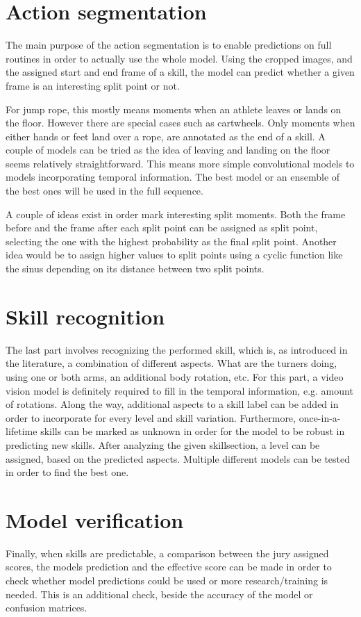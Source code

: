 \section{Action segmentation}

The main purpose of the action segmentation is to enable predictions on full routines in order to actually use the whole model. Using the cropped images, and the assigned start and end frame of a skill, the model can predict whether a given frame is an interesting split point or not.

For jump rope, this mostly means moments when an athlete leaves or lands on the floor. However there are special cases such as cartwheels. Only moments when either hands or feet land over a rope, are annotated as the end of a skill. A couple of models can be tried as the idea of leaving and landing on the floor seems relatively straightforward. This means more simple convolutional models to models incorporating temporal information.
The best model or an ensemble of the best ones will be used in the full sequence.

A couple of ideas exist in order mark interesting split moments. Both the frame before and the frame after each split point can be assigned as split point, selecting the one with the highest probability as the final split point. Another idea would be to assign higher values to split points using a cyclic function like the sinus depending on its distance between two split points.

\section{Skill recognition}

The last part involves recognizing the performed skill, which is, as introduced in the literature, a combination of different aspects. What are the turners doing, using one or both arms, an additional body rotation, etc.
For this part, a video vision model is definitely required to fill in the temporal information, e.g. amount of rotations.
Along the way, additional aspects to a skill label can be added in order to incorporate for every level and skill variation.
Furthermore, once-in-a-lifetime skills can be marked as unknown in order for the model to be robust in predicting new skills. After analyzing the given skillsection, a level can be assigned, based on the predicted aspects.
Multiple different models can be tested in order to find the best one.


\section{Model verification}

Finally, when skills are predictable, a comparison between the jury assigned scores, the models prediction and the effective score can be made in order to check whether model predictions could be used or more research/training is needed. This is an additional check, beside the accuracy of the model or confusion matrices.

